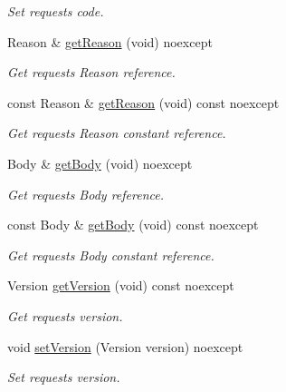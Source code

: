 \begin{DoxyCompactItemize}
\begin{DoxyCompactList}\small\item\em Set request\textquotesingle{}s code. \end{DoxyCompactList}\item 
Reason \& \mbox{\hyperlink{classo_z_1_1o_z_1_1_h_t_t_p_1_1_response_a1b22656669aec22e111afb2e39655114}{get\+Reason}} (void) noexcept
\begin{DoxyCompactList}\small\item\em Get request\textquotesingle{}s Reason reference. \end{DoxyCompactList}\item 
const Reason \& \mbox{\hyperlink{classo_z_1_1o_z_1_1_h_t_t_p_1_1_response_ab5d11575fd4842621074d0c3194703a1}{get\+Reason}} (void) const noexcept
\begin{DoxyCompactList}\small\item\em Get request\textquotesingle{}s Reason constant reference. \end{DoxyCompactList}\item 
Body \& \mbox{\hyperlink{classo_z_1_1o_z_1_1_h_t_t_p_1_1_response_aa7239adea5d18861a4ecbd70a93ab40a}{get\+Body}} (void) noexcept
\begin{DoxyCompactList}\small\item\em Get request\textquotesingle{}s Body reference. \end{DoxyCompactList}\item 
const Body \& \mbox{\hyperlink{classo_z_1_1o_z_1_1_h_t_t_p_1_1_response_a2c8072067e95c0059ce8777e6fb1f772}{get\+Body}} (void) const noexcept
\begin{DoxyCompactList}\small\item\em Get request\textquotesingle{}s Body constant reference. \end{DoxyCompactList}\item 
Version \mbox{\hyperlink{classo_z_1_1o_z_1_1_h_t_t_p_1_1_response_a3ef2c29c0e0f5f6ba98598b5fea78e65}{get\+Version}} (void) const noexcept
\begin{DoxyCompactList}\small\item\em Get request\textquotesingle{}s version. \end{DoxyCompactList}\item 
void \mbox{\hyperlink{classo_z_1_1o_z_1_1_h_t_t_p_1_1_response_a99f05ea27e06aea1ae45f970740d51b8}{set\+Version}} (Version version) noexcept
\begin{DoxyCompactList}\small\item\em Set request\textquotesingle{}s version. \end{DoxyCompactList}\item 

\end{DoxyCompactItemize}
